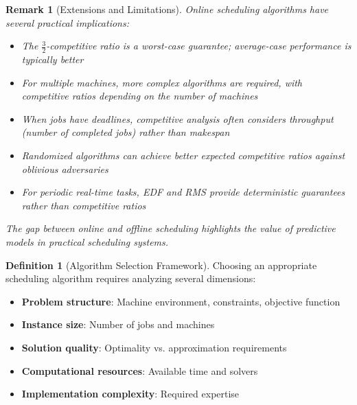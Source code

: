 \documentclass{article}
\newtheorem{remark}{Remark}
\theoremstyle{definition}
\newtheorem{definition}{Definition}
\begin{document}
\begin{remark}[Extensions and Limitations]
Online scheduling algorithms have several practical implications:
\begin{itemize}
    \item The $\frac{3}{2}$-competitive ratio is a worst-case guarantee; average-case performance is typically better
    \item For multiple machines, more complex algorithms are required, with competitive ratios depending on the number of machines
    \item When jobs have deadlines, competitive analysis often considers throughput (number of completed jobs) rather than makespan
    \item Randomized algorithms can achieve better expected competitive ratios against oblivious adversaries
    \item For periodic real-time tasks, EDF and RMS provide deterministic guarantees rather than competitive ratios
\end{itemize}

The gap between online and offline scheduling highlights the value of predictive models in practical scheduling systems.
\end{remark}

\begin{definition}[Algorithm Selection Framework]
Choosing an appropriate scheduling algorithm requires analyzing several dimensions:
\begin{itemize}
    \item \textbf{Problem structure}: Machine environment, constraints, objective function
    \item \textbf{Instance size}: Number of jobs and machines
    \item \textbf{Solution quality}: Optimality vs. approximation requirements
    \item \textbf{Computational resources}: Available time and solvers
    \item \textbf{Implementation complexity}: Required expertise
\end{itemize}
\end{definition}
\end{document}
